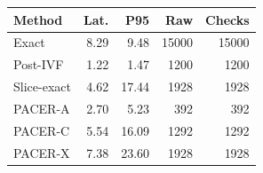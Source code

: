 \begin{tabular}{lrrrr}
\toprule
Method & Lat. & P95 & Raw & Checks\\
\midrule
Exact & 8.29 & 9.48 & 15000 & 15000\\
Post-IVF & 1.22 & 1.47 & 1200 & 1200\\
Slice-exact & 4.62 & 17.44 & 1928 & 1928\\
PACER-A & 2.70 & 5.23 & 392 & 392\\
PACER-C & 5.54 & 16.09 & 1292 & 1292\\
PACER-X & 7.38 & 23.60 & 1928 & 1928\\
\bottomrule
\end{tabular}